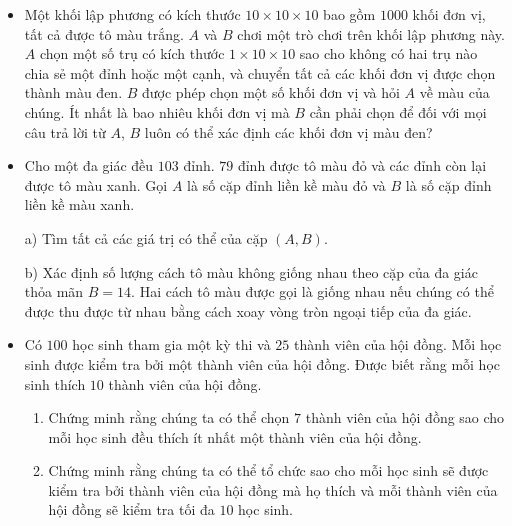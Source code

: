\documentclass[11pt]{scrartcl}
\begin{document}
\begin{itemize}[label=, leftmargin=0em, itemsep=0.5em]
    \item \begin{btvn}
        Một khối lập phương có kích thước $10\times 10\times 10$ bao gồm $1000$ khối đơn vị, tất cả được tô màu trắng. $A$ và $B$ chơi một trò chơi trên khối lập phương này. $A$ chọn một số trụ có kích thước $1\times 10\times 10$ sao cho không có hai trụ nào chia sẻ một đỉnh hoặc một cạnh, và chuyển tất cả các khối đơn vị được chọn thành màu đen. $B$ được phép chọn một số khối đơn vị và hỏi $A$ về màu của chúng. Ít nhất là bao nhiêu khối đơn vị mà $B$ cần phải chọn để đối với mọi câu trả lời từ $A$, $B$ luôn có thể xác định các khối đơn vị màu đen?  
    \end{btvn}

    \item\begin{btvn}
        Cho một đa giác đều $103$ đỉnh. $79$ đỉnh được tô màu đỏ và các đỉnh còn lại được tô màu xanh. Gọi $A$ là số cặp đỉnh liền kề màu đỏ và $B$ là số cặp đỉnh liền kề màu xanh.


        a) Tìm tất cả các giá trị có thể của cặp $(A,B).$


        b) Xác định số lượng cách tô màu không giống nhau theo cặp của đa giác thỏa mãn $B=14.$ Hai cách tô màu được gọi là giống nhau nếu chúng có thể được thu được từ nhau bằng cách xoay vòng tròn ngoại tiếp của đa giác.
        \end{btvn}

    \item \begin{btvn}
    Có $100$ học sinh tham gia một kỳ thi và $25$ thành viên của hội đồng. Mỗi học sinh được kiểm tra bởi một thành viên của hội đồng. Được biết rằng mỗi học sinh thích $10$ thành viên của hội đồng.
    \begin{enumerate}[label=(\alph*)]
        \item Chứng minh rằng chúng ta có thể chọn $7$ thành viên của hội đồng sao cho mỗi học sinh đều thích ít nhất một thành viên của hội đồng.
        \item Chứng minh rằng chúng ta có thể tổ chức sao cho mỗi học sinh sẽ được kiểm tra bởi thành viên của hội đồng mà họ thích và mỗi thành viên của hội đồng sẽ kiểm tra tối đa $10$ học sinh.
    \end{enumerate}
    \end{btvn}


\end{itemize}
\end{document}
